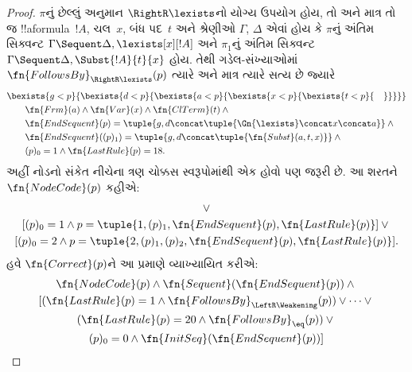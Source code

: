 \documentclass[../../../include/open-logic-section]{subfiles}
\begin{document}
\begin{proof}
$\pi$નું છેલ્લું અનુમાન
$\RightR\lexists$નો યોગ્ય ઉપયોગ હોય,
તો અને માત્ર તો જ !!a{formula}~$!A$,
ચલ~$x$, બંધ પદ~$t$ અને શ્રેણીઓ
$\Gamma$, $\Delta$ એવાં હોય કે
$\pi$નું અંતિમ સિક્વન્ટ
$\Gamma \Sequent \Delta, \lexists[x][!A]$
અને $\pi_1$નું અંતિમ સિક્વન્ટ
$\Gamma \Sequent \Delta,
\Subst{!A}{t}{x}$ હોય. તેથી
ગડેલ-સંખ્યાઓમાં
$\fn{FollowsBy}_{\RightR\lexists}(p)$
ત્યારે અને માત્ર ત્યારે સત્ય છે જ્યારે
\begin{align*}
  & \bexists{g<p}{\bexists{d<p}{\bexists{a<p}{\bexists{x<p}{\bexists{t<p}{\quad}}}}}\\
  & \qquad \fn{Frm}(a) \land \fn{Var}(x) \land \fn{ClTerm}(t) \land {}\\
  & \qquad \fn{EndSequent}(p) = 
  \tuple{
    g,
    d \concat \tuple{\Gn{\lexists} \concat x \concat a}
  } \land {}\\
  & \qquad \fn{EndSequent}((p)_1) = 
  \tuple{
    g,
    d \concat \tuple{\fn{Subst}(a, t, x)}
  } \land {}\\
  & \qquad (p)_0 = 1 \land \fn{LastRule}(p) = 18.
\end{align*}
અહીં નોડનો સંકેત નીચેના ત્રણ ચોક્કસ સ્વરૂપોમાંથી
એક હોવો પણ જરૂરી છે. આ શરતને
$\fn{NodeCode}(p)$ કહીએ:
\begin{multline*}
[(p)_0=0 \land p=\tuple{0,\fn{EndSequent}(p)}] \lor {}\\
[(p)_0=1 \land p=\tuple{1,(p)_1,\fn{EndSequent}(p),\fn{LastRule}(p)}] \lor {}\\
[(p)_0=2 \land p=\tuple{2,(p)_1,(p)_2,\fn{EndSequent}(p),\fn{LastRule}(p)}].
\end{multline*}
હવે $\fn{Correct}(p)$ને આ પ્રમાણે
વ્યાખ્યાયિત કરીએ:
\begin{multline*}
  \fn{NodeCode}(p) \land \fn{Sequent}(\fn{EndSequent}(p)) \land {}\\ 
  [(\fn{LastRule}(p) = 1 \land 
  \fn{FollowsBy}_{\LeftR\Weakening}(p)) \lor \dots \lor {}\\
  (\fn{LastRule}(p) = 20 \land \fn{FollowsBy}_{\eq}(p)) \lor {}\\
  (p)_0 = 0 \land \fn{InitSeq}(\fn{EndSequent}(p))]
\end{multline*}

\end{proof}
\end{document}
